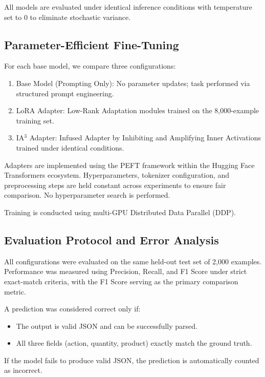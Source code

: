 \documentclass[journal,article,submit,pdftex,moreauthors]{Definitions/mdpi}
\begin{document}
All models are evaluated under identical inference conditions with temperature set to 0 to eliminate stochastic variance.

\subsection{Parameter-Efficient Fine-Tuning}

For each base model, we compare three configurations:

\begin{enumerate}
    \item Base Model (Prompting Only): No parameter updates; task performed via structured prompt engineering.
    \item LoRA Adapter: Low-Rank Adaptation modules trained on the 8,000-example training set.
    \item IA$^3$ Adapter: Infused Adapter by Inhibiting and Amplifying Inner Activations trained under identical conditions.
\end{enumerate}

Adapters are implemented using the PEFT framework within the Hugging Face Transformers ecosystem. Hyperparameters, tokenizer configuration, and preprocessing steps are held constant across experiments to ensure fair comparison. No hyperparameter search is performed.

Training is conducted using multi-GPU Distributed Data Parallel (DDP).

\subsection{Evaluation Protocol and Error Analysis}

All configurations were evaluated on the same held-out test set of 2,000 examples. Performance was measured using Precision, Recall, and F1 Score under strict exact-match criteria, with the F1 Score serving as the primary comparison metric.

A prediction was considered correct only if:
\begin{itemize}
    \item The output is valid JSON and can be successfully parsed.
    \item All three fields (action, quantity, product) exactly match the ground truth.
\end{itemize}

If the model fails to produce valid JSON, the prediction is automatically counted as incorrect.
\end{document}
